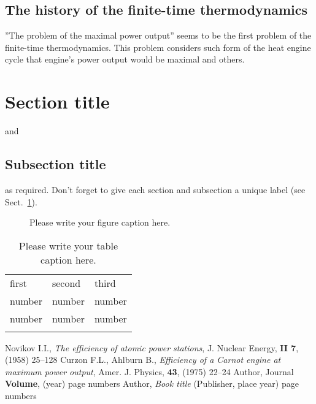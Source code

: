 \documentclass[epjST]{svjour}
\begin{document}
\subsection*{The history of the finite-time thermodynamics}
''The problem of the maximal power output'' seems to be the first problem of the finite-time thermodynamics. This problem considers such form of the heat engine cycle that engine's power output would be maximal\cite{Nov}\cite{CurAhl} and others.

\section{Section title}
\label{sec:1}
and \cite{RefJ}
\subsection{Subsection title}
\label{sec:2}
as required. Don't forget to give each section
and subsection a unique label (see Sect.~\ref{sec:1}).
%

\begin{figure}
\caption{Please write your figure caption here.}
\label{fig:1}       %
\end{figure}
%
\begin{table}
\caption{Please write your table caption here.}
\label{tab:1}       %
\begin{tabular}{lll}
\hline\noalign{\smallskip}
first & second & third  \\
\noalign{\smallskip}\hline\noalign{\smallskip}
number & number & number \\
number & number & number \\
\noalign{\smallskip}\hline
\end{tabular}
\end{table}
%
\begin{thebibliography}{}
Novikov I.I., \textit{The efficiency of atomic power stations}, J. Nuclear Energy, \textbf{II 7}, (1958) 25--128
Curzon F.L., Ahlburn B., \textit{Efficiency of a Carnot engine at maximum power output}, Amer. J. Physics, \textbf{43}, (1975) 22--24
Author, Journal \textbf{Volume}, (year) page numbers
Author, \textit{Book title} (Publisher, place year) page numbers
\end{thebibliography}
\end{document}
